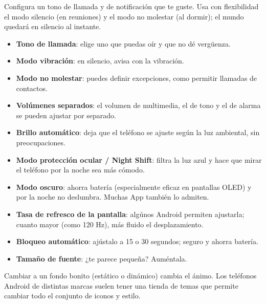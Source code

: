 


Configura un tono de llamada y de notificación que te guste. Usa con flexibilidad el modo silencio (en reuniones) y el modo no molestar (al dormir); el mundo quedará en silencio al instante.

\begin{itemize}
  \item \textbf{Tono de llamada}: elige uno que puedas oír y que no dé vergüenza.
  \item \textbf{Modo vibración}: en silencio, avisa con la vibración.
  \item \textbf{Modo no molestar}: puedes definir excepciones, como permitir llamadas de contactos.
  \item \textbf{Volúmenes separados}: el volumen de multimedia, el de tono y el de alarma se pueden ajustar por separado.
\end{itemize}


\begin{itemize}
  \item \textbf{Brillo automático}: deja que el teléfono se ajuste según la luz ambiental, sin preocupaciones.
  \item \textbf{Modo protección ocular / Night Shift}: filtra la luz azul y hace que mirar el teléfono por la noche sea más cómodo.
  \item \textbf{Modo oscuro}: ahorra batería (especialmente eficaz en pantallas OLED) y por la noche no deslumbra. Muchas App también lo admiten.
  \item \textbf{Tasa de refresco de la pantalla}: algúnos Android permiten ajustarla; cuanto mayor (como 120 Hz), más fluido el desplazamiento.
  \item \textbf{Bloqueo automático}: ajústalo a 15 o 30 segundos; seguro y ahorra batería.
  \item \textbf{Tamaño de fuente}: ¿te parece pequeña? Auméntala.
\end{itemize}


Cambiar a un fondo bonito (estático o dinámico) cambia el ánimo. Los teléfonos Android de distintas marcas suelen tener una tienda de temas que permite cambiar todo el conjunto de iconos y estilo.

